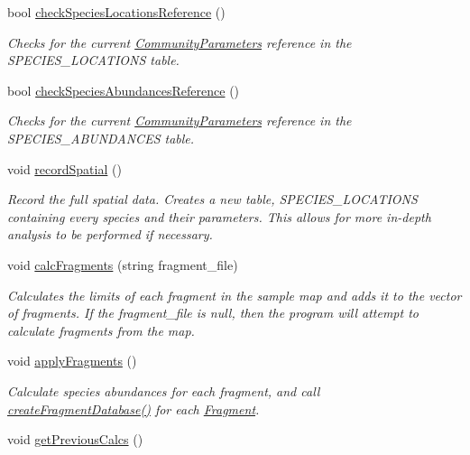 \begin{DoxyCompactItemize}
bool \hyperlink{class_community_a23b9398df3a63c75d01e3ed3982432c2}{check\+Species\+Locations\+Reference} ()
\begin{DoxyCompactList}\small\item\em Checks for the current \hyperlink{struct_community_parameters}{Community\+Parameters} reference in the S\+P\+E\+C\+I\+E\+S\+\_\+\+L\+O\+C\+A\+T\+I\+O\+NS table. \end{DoxyCompactList}\item 
bool \hyperlink{class_community_a5b2236c98b613c0ec96998bd932101f5}{check\+Species\+Abundances\+Reference} ()
\begin{DoxyCompactList}\small\item\em Checks for the current \hyperlink{struct_community_parameters}{Community\+Parameters} reference in the S\+P\+E\+C\+I\+E\+S\+\_\+\+A\+B\+U\+N\+D\+A\+N\+C\+ES table. \end{DoxyCompactList}\item 
void \hyperlink{class_community_a08be240fddc6ea481014567276a84dd0}{record\+Spatial} ()\hypertarget{class_community_a08be240fddc6ea481014567276a84dd0}{}\label{class_community_a08be240fddc6ea481014567276a84dd0}

\begin{DoxyCompactList}\small\item\em Record the full spatial data. Creates a new table, S\+P\+E\+C\+I\+E\+S\+\_\+\+L\+O\+C\+A\+T\+I\+O\+NS containing every species and their parameters. This allows for more in-\/depth analysis to be performed if necessary. \end{DoxyCompactList}\item 
void \hyperlink{class_community_ac9433a0c34911ec1128b5459f61488fc}{calc\+Fragments} (string fragment\+\_\+file)
\begin{DoxyCompactList}\small\item\em Calculates the limits of each fragment in the sample map and adds it to the vector of fragments. If the fragment\+\_\+file is null, then the program will attempt to calculate fragments from the map. \end{DoxyCompactList}\item 
void \hyperlink{class_community_a706aba5b07c98849cb2b4b0318488f99}{apply\+Fragments} ()\hypertarget{class_community_a706aba5b07c98849cb2b4b0318488f99}{}\label{class_community_a706aba5b07c98849cb2b4b0318488f99}

\begin{DoxyCompactList}\small\item\em Calculate species abundances for each fragment, and call \hyperlink{class_community_ad6515ff43ea8189a1acdcccfe893bbba}{create\+Fragment\+Database()} for each \hyperlink{struct_fragment}{Fragment}. \end{DoxyCompactList}\item 
void \hyperlink{class_community_a24c425f32b1e3b10227e2d04cbacfe31}{get\+Previous\+Calcs} ()\hypertarget{class_community_a24c425f32b1e3b10227e2d04cbacfe31}{}\label{class_community_a24c425f32b1e3b10227e2d04cbacfe31}


\end{DoxyCompactItemize}
